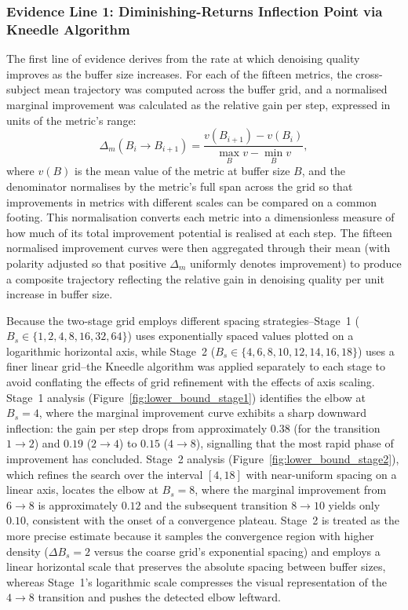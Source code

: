 \documentclass[MScCS,12pt,oneside,final]{uccthesis}
\begin{document}
\subsubsection*{Evidence Line 1: Diminishing-Returns Inflection Point via Kneedle Algorithm}

The first line of evidence derives from the rate at which denoising quality improves as the buffer size increases. For each of the fifteen metrics, the cross-subject mean trajectory was computed across the buffer grid, and a normalised marginal improvement was calculated as the relative gain per step, expressed in units of the metric's range:
\begin{equation}
    \Delta_m(B_i \to B_{i+1}) = \frac{v(B_{i+1}) - v(B_i)}{\max_B v - \min_B v},
\end{equation}
where $v(B)$ is the mean value of the metric at buffer size $B$, and the denominator normalises by the metric's full span across the grid so that improvements in metrics with different scales can be compared on a common footing. This normalisation converts each metric into a dimensionless measure of how much of its total improvement potential is realised at each step. The fifteen normalised improvement curves were then aggregated through their mean (with polarity adjusted so that positive $\Delta_m$ uniformly denotes improvement) to produce a composite trajectory reflecting the relative gain in denoising quality per unit increase in buffer size.

Because the two-stage grid employs different spacing strategies--Stage~1 ($B_s \in \{1, 2, 4, \allowbreak 8, 16, 32, 64\}$) uses exponentially spaced values plotted on a logarithmic horizontal axis, while Stage~2 ($B_s \in \{4, 6, 8, 10, 12, 14, 16, 18\}$) uses a finer linear grid--the Kneedle algorithm was applied separately to each stage to avoid conflating the effects of grid refinement with the effects of axis scaling. Stage~1 analysis (Figure~\ref{fig:lower_bound_stage1}) identifies the elbow at $B_s = 4$, where the marginal improvement curve exhibits a sharp downward inflection: the gain per step drops from approximately $0.38$ (for the transition $1 \to 2$) and $0.19$ ($2 \to 4$) to $0.15$ ($4 \to 8$), signalling that the most rapid phase of improvement has concluded. Stage~2 analysis (Figure~\ref{fig:lower_bound_stage2}), which refines the search over the interval $[4, 18]$ with near-uniform spacing on a linear axis, locates the elbow at $B_s = 8$, where the marginal improvement from $6 \to 8$ is approximately $0.12$ and the subsequent transition $8 \to 10$ yields only $0.10$, consistent with the onset of a convergence plateau. Stage~2 is treated as the more precise estimate because it samples the convergence region with higher density ($\Delta B_s = 2$ versus the coarse grid's exponential spacing) and employs a linear horizontal scale that preserves the absolute spacing between buffer sizes, whereas Stage~1's logarithmic scale compresses the visual representation of the $4 \to 8$ transition and pushes the detected elbow leftward.
\end{document}
